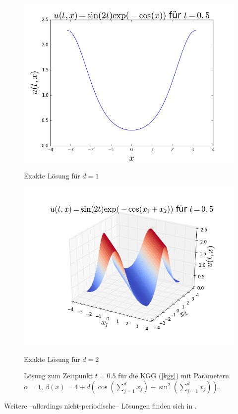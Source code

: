 \begin{figure}[!htb]
  \includegraphics[width=\linewidth]{Figures/kgg_exact_solution_example1d.png}
  \caption{Exakte Lösung für $d=1$}
\endminipage
{}
  \includegraphics[width=\linewidth]{Figures/kgg_exact_solution_example2d.png}
  \caption{Exakte Lösung für $d=2$}
\endminipage
\captionsetup{labelformat=empty}
\caption{Lösung zum Zeitpunkt $t=0.5$ für die KGG (\ref{kgg}) mit Parametern $\alpha=1$, $
\beta(x)=4+d(\cos(\sum_{j=1}^dx_j)+\sin^2(\sum_{j=1}^dx_j))$.}
\end{figure}

Weitere --allerdings nicht-periodische-- Lösungen finden sich in \autocite{andreipolyanin2004}.

